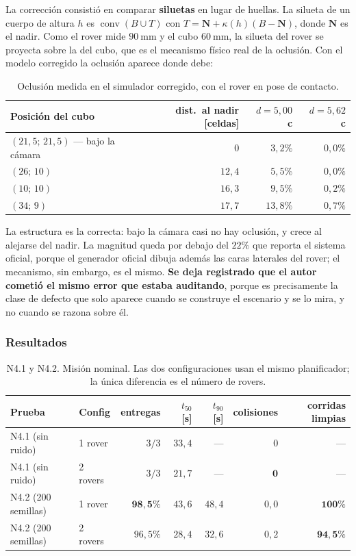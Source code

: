 \documentclass[11pt,a4paper]{article}
\newcommand{\conv}{\operatorname{conv}}
\begin{document}
La corrección consistió en comparar \textbf{siluetas} en lugar de huellas. La silueta de
un cuerpo de altura $h$ es $\conv(B \cup T)$ con $T = \mathbf N + \kappa(h)(B-\mathbf N)$,
donde $\mathbf N$ es el nadir. Como el rover mide $90\ \mathrm{mm}$ y el cubo
$60\ \mathrm{mm}$, la silueta del rover se proyecta sobre la del cubo, que es el
mecanismo físico real de la oclusión. Con el modelo corregido la oclusión aparece donde
debe:

\begin{table}[htbp]
\centering
\small
\caption{Oclusión medida en el simulador corregido, con el rover en pose de contacto.}
\begin{tabular}{lrrr}
\toprule
Posición del cubo & dist.\ al nadir [celdas] & $d=5{,}00$ c & $d=5{,}62$ c \\
\midrule
$(21{,}5;\,21{,}5)$ --- bajo la cámara & $0$ & $3{,}2\%$ & $0{,}0\%$ \\
$(26;\,10)$ & $12{,}4$ & $5{,}5\%$ & $0{,}0\%$ \\
$(10;\,10)$ & $16{,}3$ & $9{,}5\%$ & $0{,}2\%$ \\
$(34;\,9)$ & $17{,}7$ & $13{,}8\%$ & $0{,}7\%$ \\
\bottomrule
\end{tabular}
\end{table}

La estructura es la correcta: bajo la cámara casi no hay oclusión, y crece al alejarse
del nadir. La magnitud queda por debajo del $22\%$ que reporta el sistema oficial,
porque el generador oficial dibuja además las caras laterales del rover; el mecanismo,
sin embargo, es el mismo. \textbf{Se deja registrado que el autor cometió el mismo error
que estaba auditando}, porque es precisamente la clase de defecto que solo aparece
cuando se construye el escenario y se lo mira, y no cuando se razona sobre él.

\subsubsection{Resultados}

\begin{table}[htbp]
\centering
\small
\caption{N4.1 y N4.2. Misión nominal. Las dos configuraciones usan el mismo
planificador; la única diferencia es el número de rovers.}
\begin{tabular}{llrrrrr}
\toprule
Prueba & Config & entregas & $t_{50}$ [s] & $t_{90}$ [s] & colisiones & corridas limpias \\
\midrule
N4.1 (sin ruido) & 1 rover  & $3/3$ & $33{,}4$ & --- & $0$ & --- \\
N4.1 (sin ruido) & 2 rovers & $3/3$ & $21{,}7$ & --- & $\mathbf{0}$ & --- \\
\addlinespace
N4.2 (200 semillas) & 1 rover  & $\mathbf{98{,}5\%}$ & $43{,}6$ & $48{,}4$ & $0{,}0$ & $\mathbf{100\%}$ \\
N4.2 (200 semillas) & 2 rovers & $96{,}5\%$ & $28{,}4$ & $32{,}6$ & $0{,}2$ & $\mathbf{94{,}5\%}$ \\
\bottomrule
\end{tabular}
\end{table}
\end{document}
